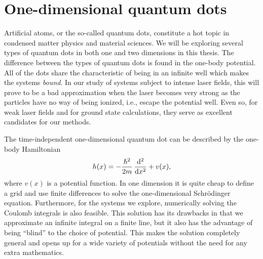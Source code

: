 \section{One-dimensional quantum dots}
    \label{sec:one-dim-qd}
    Artificial atoms, or the so-called quantum dots, constitute a hot topic in
    condensed matter physics and material sciences. We will be exploring
    several types of quantum dots in both one and two dimensions in this
    thesis. The difference between the types of quantum dots is found in the
    one-body potential. All of the dots share the characteristic of being in an
    infinite well which makes the systems \emph{bound}. In our study of systems
    subject to intense laser fields, this will prove to be a bad approximation
    when the laser becomes very strong as the particles have no way of being
    ionized, i.e., escape the potential well.  Even so, for weak laser fields
    and for ground state calculations, they serve as excellent candidates for
    our methods.

    The time-independent one-dimensional quantum dot can be described by the
    one-body Hamiltonian
    \begin{align}
        \oneten(x)
        = -\frac{\hslash^2}{2m} \dod[2]{}{x}
        + v(x),
        \label{eq:one-body-odqd}
    \end{align}
    where $v(x)$ is a potential function.
    In one dimension it is quite cheap to define a grid and use finite
    differences to solve the one-dimensional Schrödinger equation.
    Furthermore, for the systems we explore, numerically solving the Coulomb
    integrals is also feasible.
    This solution has its drawbacks in that we approximate an infinite integral
    on a finite line, but it also has the advantage of being ``blind'' to the
    choice of potential.
    This makes the solution completely general and opens up for a wide variety
    of potentials without the need for any extra mathematics.

